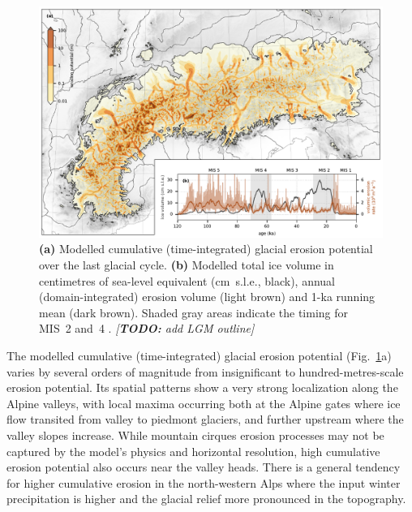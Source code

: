 \documentclass[esurf, manuscript]{copernicus}
\newcommand{\todo}[1]{\textcolor{Rd}{\emph{[\textbf{TODO:} #1]}}}
\begin{document}
    \begin{figure}
      \centerline{\includegraphics{alpero_cumulative}}
      \caption{%
        \textbf{(a)} Modelled cumulative (time-integrated) glacial erosion
          potential over the last glacial cycle.
        \textbf{(b)} Modelled total ice volume in centimetres of sea-level
          equivalent (cm~s.l.e., black), annual (domain-integrated) erosion
          volume (light brown) and 1-ka running mean (dark brown). Shaded gray
          areas indicate the timing for MIS~2 and~4
          \citep{Lisiecki.Raymo.2005}.
        \todo{add LGM outline}}
        \label{fig:cumulative}
    \end{figure}

    The modelled cumulative (time-integrated) glacial erosion potential
    (Fig.~\ref{fig:cumulative}a) varies by several orders of magnitude
    from insignificant to hundred-metres-scale erosion potential. Its spatial
    patterns show a very strong localization along the Alpine valleys, with
    local maxima occurring both at
    the Alpine gates where ice flow transited from valley to piedmont glaciers,
    and further upstream where the valley slopes increase. While mountain
    cirques erosion processes may not be captured by the model's physics
    \citep[cf.][]{Sanders.etal.2012} and horizontal resolution, high
    cumulative erosion potential also occurs near the valley heads.
    There is a general tendency for higher cumulative erosion in the
    north-western Alps where the input winter precipitation is higher
    \citep[WorldClim, Fig.~1h in][]{Seguinot.etal.2018} and the glacial relief
    more pronounced in the topography.

\end{document}
